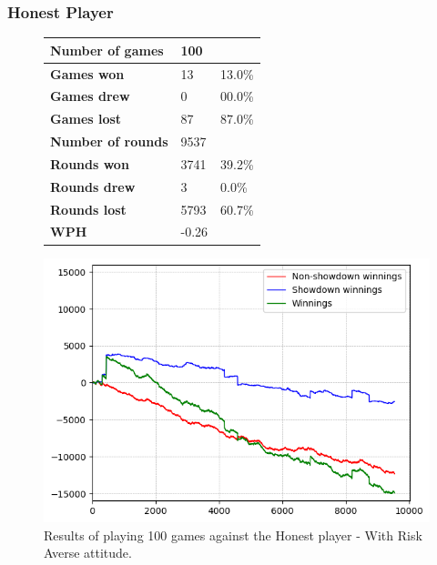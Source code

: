 \subsubsection{Honest Player}
\begin{figure}[H]
    \centering
    \begin{minipage}{\textwidth}
        \begin{minipage}{0.40\textwidth}
            \begin{tabular}{|l|l|l|}
                \hline
                \textbf{Number of games}  & 100   &        \\ \hline
                \textbf{Games won}        & 13    & 13.0\% \\ \hline
                \textbf{Games drew}       & 0     & 00.0\%  \\ \hline
                \textbf{Games lost}       & 87    & 87.0\% \\ \hline
                \textbf{Number of rounds} & 9537  &        \\ \hline
                \textbf{Rounds won}       & 3741   & 39.2\%  \\ \hline
                \textbf{Rounds drew}      & 3     & 0.0\%  \\ \hline
                \textbf{Rounds lost}      & 5793  & 60.7\% \\ \hline
                \textbf{WPH}              & -0.26 &        \\ \hline
            \end{tabular}
        \end{minipage}
        \hspace{0.05\textwidth}
        \begin{minipage}{0.5\textwidth}
            \includegraphics[width=\textwidth]{graphics/risk-averse/honest.png}
        \end{minipage}
    \end{minipage}
    \caption{Results of playing 100 games against the Honest player - With Risk Averse attitude.}
    \label{fig:results_averse_honest}
\end{figure}

